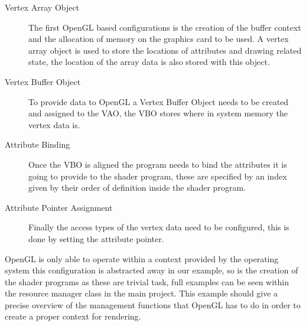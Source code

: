 \begin{description}
\item[Vertex Array Object] The first OpenGL based configurations is the 
creation of the buffer context and the allocation of memory on the graphics card
to be used. A vertex array object is used to store the locations of attributes 
and drawing related state, the location of the array data is also stored with
this object.
\item[Vertex Buffer Object]
To provide data to OpenGL a Vertex Buffer Object needs to be created
and assigned to the VAO, the VBO stores where in system memory the vertex data 
is. 
\item[Attribute Binding]
Once the VBO is aligned the program needs to bind the attributes it is going
to provide to the shader program, these are specified by an index given by their
order of definition inside the shader program.
\item[Attribute Pointer Assignment]
Finally the access types of the 
vertex data need to be configured, this is done by setting the attribute 
pointer. 
\end{description}

OpenGL is only able to operate within a context provided by the operating system
this configuration is abstracted away in our example, so is the creation of the
shader programs as these are trivial task, full examples can be seen within the
resource manager class in the main project. This example should give a precise
overview of the management functions that OpenGL has to do in order to create a 
proper context for rendering.\\


